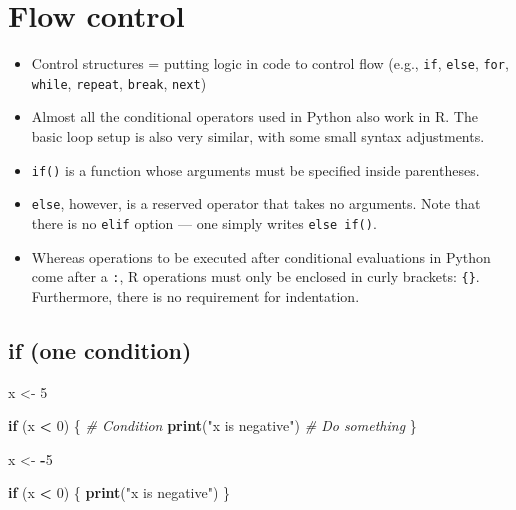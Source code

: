\documentclass[
]{book}
\newenvironment{Shaded}{\begin{snugshade}}{\end{snugshade}}
\newcommand{\CommentTok}[1]{\textcolor[rgb]{0.56,0.35,0.01}{\textit{#1}}}
\newcommand{\ControlFlowTok}[1]{\textcolor[rgb]{0.13,0.29,0.53}{\textbf{#1}}}
\newcommand{\DecValTok}[1]{\textcolor[rgb]{0.00,0.00,0.81}{#1}}
\newcommand{\FunctionTok}[1]{\textcolor[rgb]{0.13,0.29,0.53}{\textbf{#1}}}
\newcommand{\NormalTok}[1]{#1}
\newcommand{\OtherTok}[1]{\textcolor[rgb]{0.56,0.35,0.01}{#1}}
\newcommand{\SpecialCharTok}[1]{\textcolor[rgb]{0.81,0.36,0.00}{\textbf{#1}}}
\newcommand{\StringTok}[1]{\textcolor[rgb]{0.31,0.60,0.02}{#1}}
\begin{document}
\section{Flow control}\label{flow}

\begin{itemize}
\item
  Control structures = putting logic in code to control flow (e.g., \texttt{if}, \texttt{else}, \texttt{for}, \texttt{while}, \texttt{repeat}, \texttt{break}, \texttt{next})
\item
  Almost all the conditional operators used in Python also work in R. The basic loop setup is also very similar, with some small syntax adjustments.
\item
  \texttt{if()} is a function whose arguments must be specified inside parentheses.
\item
  \texttt{else}, however, is a reserved operator that takes no arguments. Note that there is no \texttt{elif} option --- one simply writes \texttt{else\ if()}.
\item
  Whereas operations to be executed after conditional evaluations in Python come after a \texttt{:}, R operations must only be enclosed in curly brackets: \texttt{\{\}}. Furthermore, there is no requirement for indentation.
\end{itemize}

\subsection{if (one condition)}\label{if-one-condition}

\begin{Shaded}
\begin{Highlighting}[]
\NormalTok{x }\OtherTok{\textless{}{-}} \DecValTok{5}

\ControlFlowTok{if}\NormalTok{ (x }\SpecialCharTok{\textless{}} \DecValTok{0}\NormalTok{) \{ }\CommentTok{\# Condition }
  \FunctionTok{print}\NormalTok{(}\StringTok{"x is negative"}\NormalTok{) }\CommentTok{\# Do something }
\NormalTok{\}}
\end{Highlighting}
\end{Shaded}

\begin{Shaded}
\begin{Highlighting}[]
\NormalTok{x }\OtherTok{\textless{}{-}} \SpecialCharTok{{-}}\DecValTok{5}

\ControlFlowTok{if}\NormalTok{ (x }\SpecialCharTok{\textless{}} \DecValTok{0}\NormalTok{) \{}
  \FunctionTok{print}\NormalTok{(}\StringTok{"x is negative"}\NormalTok{)}
\NormalTok{\}}
\end{Highlighting}
\end{Shaded}
\end{document}
